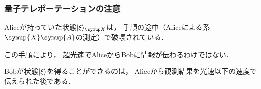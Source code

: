 \documentclass[
    10pt,
    ]{sotsu-beamer}
\begin{document}
\begin{frame}
    \frametitle{量子テレポーテーションの注意}

    Aliceが持っていた状態$\ket{\xi}<X>$は，
    手順の途中（Aliceによる系$\symup{X} \symup{A}$の測定）で破壊されている．

    この手順により，
    \alert{超光速でAliceからBobに情報が伝わるわけではない}．

    Bobが状態$\ket{\xi}$を得ることができるのは，
    Aliceから観測結果を\alert{光速以下の速度で}伝えられた後である．

\end{frame}
\end{document}
